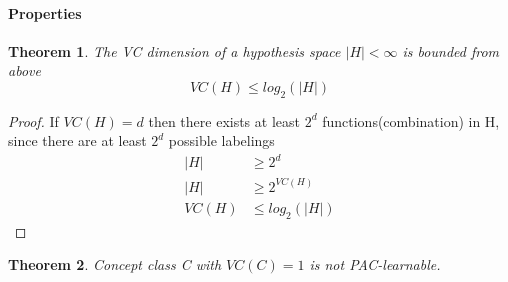\documentclass[main.tex]{subfiles}
\newtheorem{theorem}{Theorem}[section] %
\begin{document}
\paragraph{Properties}
\begin{theorem}
The VC dimension of a hypothesis space $|H| < \infty$ is bounded from above
\begin{equation*}
    VC(H) \leq log_2(|H|)
\end{equation*}
\end{theorem}
\begin{proof}
If $VC(H)=d$ then there exists at least $2^d$ functions(combination) in H, since there are at least $2^d$ possible labelings
\begin{align*}
    |H|&\geq 2^d \\
    |H|&\geq 2^{VC(H)} \\
    VC(H)&\leq log_2(|H|)
\end{align*}
\end{proof}
\begin{theorem}
Concept class C with $VC(C) = 1$ is not PAC-learnable.
\end{theorem}

\newpage
\end{document}
